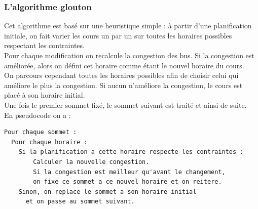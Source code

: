 \documentclass[a4paper,11pt]{article}
\begin{document}
		\subsubsection{L'algorithme glouton}
			Cet algorithme est basé sur une heuristique simple : à partir d'une planification initiale, on fait varier les cours un par un sur toutes les horaires possibles respectant les contraintes.\\
			Pour chaque modification on recalcule la congestion des bus. Si la congestion est améliorée, alors on défini cet horaire comme étant le nouvel horaire du cours.\\
			On parcours cependant toutes les horaires possibles afin de choisir celui qui améliore le plus la congestion. Si aucun n'améliore la congestion, le cours est placé à son horaire initial.\\
			Une fois le premier sommet fixé, le sommet suivant est traité et ainsi de suite.\\
			En pseudocode on a :\\
\begin{lstlisting}
Pour chaque sommet :
  Pour chaque horaire :
  	Si la planification a cette horaire respecte les contraintes :
    	Calculer la nouvelle congestion.
    	Si la congestion est meilleur qu'avant le changement,
      	on fixe ce sommet a ce nouvel horaire et on reitere. 
    Sinon, on replace le sommet a son horaire initial 
      et on passe au sommet suivant.
		\end{lstlisting}
\end{document}
